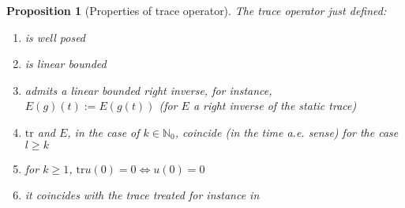 \documentclass[english,a4paper,12pt,oneside]{scrbook}
\theoremstyle{break}
\newtheorem{prop}[equation]{Proposition}
\theoremstyle{remark}
\newcommand{\tr}{\text{tr}}
\begin{document}
\begin{prop}[Properties of trace operator]
\label{prop:trace}
The trace operator just defined:
\begin{enumerate}
\item is well posed
\item is linear bounded
\item admits a linear bounded right inverse, for instance, $E(g)(t):=E(g(t))$ (for $E$ a right inverse of the static trace)
\item $\tr$ and $E$, in the case of $k \in \mathbb{N}_0$, coincide (in the time a.e. sense) for the case $l\geq k$
\item for $k\geq 1$, $\tr u(0)=0 \iff u(0)=0$
\item it coincides with the trace treated for instance in \cite{lions}
\end{enumerate}
\end{prop}
\end{document}
